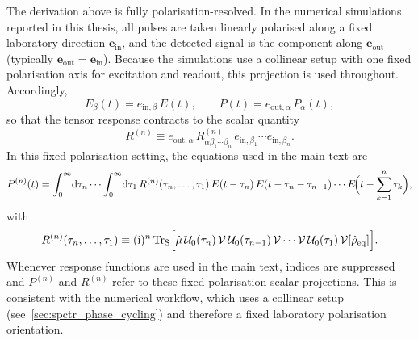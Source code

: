 The derivation above is fully polarisation-resolved. In the numerical simulations reported in this thesis, all pulses are taken linearly polarised along a fixed laboratory direction $\boldsymbol e_{\mathrm{in}}$, and the detected signal is the component along $\boldsymbol e_{\mathrm{out}}$ (typically $\boldsymbol e_{\mathrm{out}}=\boldsymbol e_{\mathrm{in}}$). Because the simulations use a collinear setup with one fixed polarisation axis for excitation and readout, this projection is used throughout. Accordingly,
\begin{equation*}
	E_\beta(t)=e_{\mathrm{in},\beta}\,E(t),
	\qquad
	P(t)=e_{\mathrm{out},\alpha}\,P_\alpha(t),
\end{equation*}
so that the tensor response contracts to the scalar quantity
\begin{equation*}
	R^{(n)} \equiv
	e_{\mathrm{out},\alpha}\,R^{(n)}_{\alpha\beta_1\cdots\beta_n}\,
	e_{\mathrm{in},\beta_1}\cdots e_{\mathrm{in},\beta_n}.
\end{equation*}
In this fixed-polarisation setting, the equations used in the main text are
\begin{equation}
	P^{(n)}(t)
	= \int_{0}^{\infty}\!\mathrm{d}\tau_n\cdots\int_{0}^{\infty}\!\mathrm{d}\tau_1\,
	R^{(n)}(\tau_n,\ldots,\tau_1)\,
	E(t-\tau_n)\,E(t-\tau_n-\tau_{n-1})\cdots
	E\!\Bigl(t-\sum_{k=1}^{n}\tau_k\Bigr),
	\label{eq:app_Pn_convolution_scalar}
\end{equation}
with
\begin{equation}
	R^{(n)}(\tau_n,\ldots,\tau_1)
	\equiv (\mathrm{i})^n\,\mathrm{Tr}_{\mathrm{S}}\Bigl[\hat{\mu}\,\mathcal{U}_0(\tau_n)\,\mathcal{V}\,\mathcal{U}_0(\tau_{n-1})\,\mathcal{V}\cdots\mathcal{V}\,\mathcal{U}_0(\tau_1)\,\mathcal{V}[\hat{\rho}_{\mathrm{eq}}]\Bigr].
	\label{eq:app_Sn_def_scalar}
\end{equation}
Whenever response functions are used in the main text, indices are suppressed and $P^{(n)}$ and $R^{(n)}$ refer to these fixed-polarisation scalar projections. This is consistent with the numerical workflow, which uses a collinear setup (see~\autoref{sec:spctr_phase_cycling}) and therefore a fixed laboratory polarisation orientation.
